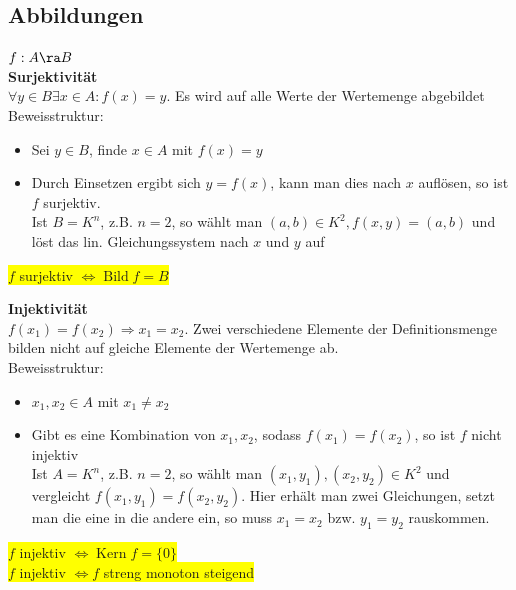 \documentclass[german, fourcolumn, 8pt]{latex4ei/latex4ei_sheet}
\newcommand{\equival}[0]{\ensuremath{\Longleftrightarrow}}
\DeclareMathOperator{\Kern}{Kern}
\DeclareMathOperator{\Bild}{Bild}
\begin{document}
\subsection{Abbildungen}
\begin{sectionbox}
    $f: A \ra B$\\
    \textbf{Surjektivität}\\
    $\forall y \in B \exists x\in A: f(x)=y$. Es wird auf alle Werte der Wertemenge abgebildet\\
    Beweisstruktur:\\
    \vspace{-2mm}
    \begin{itemize}\itemsep1pt
        \item Sei $y\in B$, finde $x \in A$ mit $f(x)=y$
        \item Durch Einsetzen ergibt sich $y=f(x)$, kann man dies nach $x$ auflösen, so ist $f$ surjektiv. \\
              Ist $B=K^n$, z.B. $n=2$, so wählt man $(a, b) \in K^2, f(x, y)=(a,b)$ und löst das lin. Gleichungssystem nach $x$ und $y$ auf
    \end{itemize}
    \colorbox{yellow}{$f$ surjektiv \equival $\Bild f = B$}

    \textbf{Injektivität}\\
    $f(x_1)=f(x_2) \Rightarrow x_1=x_2$. Zwei verschiedene Elemente der Definitionsmenge bilden nicht auf gleiche Elemente der Wertemenge ab.\\
    Beweisstruktur:\\
    \vspace{-2mm}
    \begin{itemize}
        \item $x_1, x_2 \in A$ mit $x_1\ne x_2$
        \item Gibt es eine Kombination von $x_1, x_2$, sodass $f(x_1)=f(x_2)$, so ist $f$ nicht injektiv\\
              Ist $A=K^n$, z.B. $n=2$, so wählt man $(x_1, y_1), (x_2, y_2) \in K^2$ und vergleicht $f(x_1, y_1)=f(x_2,y_2)$. Hier erhält man zwei Gleichungen, setzt man die eine in die andere ein, so muss $x_1=x_2$ bzw. $y_1=y_2$ rauskommen.
    \end{itemize}
    \colorbox{yellow}{$f$ injektiv \equival $\Kern f = \{0\}$}\\
    \colorbox{yellow}{$f$ injektiv \equival $f$ streng monoton steigend}
\end{sectionbox}
\end{document}

